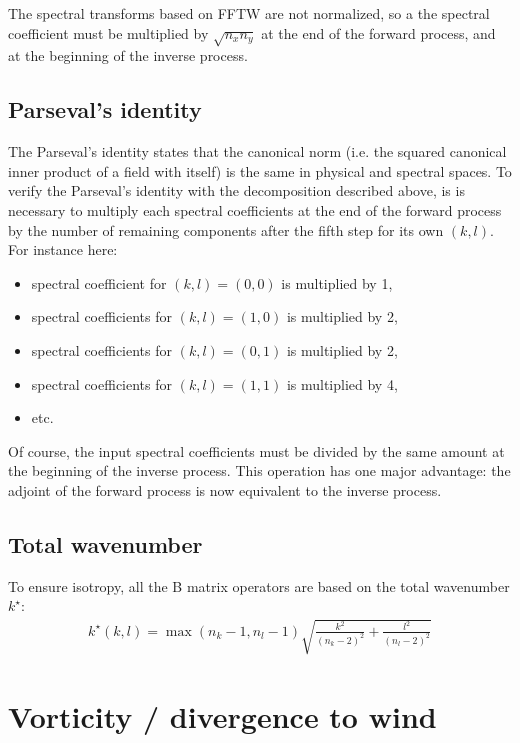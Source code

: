 \documentclass[12pt]{scrartcl}
\begin{document}
The spectral transforms based on FFTW are not normalized, so a the spectral coefficient must be multiplied by $\sqrt{n_x n_y}$ at the end of the forward process, and at the beginning of the inverse process.

\subsection{Parseval's identity}

The Parseval's identity states that the canonical norm (i.e. the squared canonical inner product of a field with itself) is the same in physical and spectral spaces. To verify the Parseval's identity with the decomposition described above, is is necessary to multiply each spectral coefficients at the end of the forward process by the number of remaining components after the fifth step for its own $(k,l)$. For instance here:
\begin{itemize}
\item spectral coefficient for $(k,l) = (0,0)$ is multiplied by 1,
\item spectral coefficients for $(k,l) = (1,0)$ is multiplied by 2,
\item spectral coefficients for $(k,l) = (0,1)$ is multiplied by 2,
\item spectral coefficients for $(k,l) = (1,1)$ is multiplied by 4,
\item etc.
\end{itemize}

Of course, the input spectral coefficients must be divided by the same amount at the beginning of the inverse process. This operation has one major advantage: the adjoint of the forward process is now equivalent to the inverse process.

\subsection{Total wavenumber}

To ensure isotropy, all the B matrix operators are based on the total wavenumber $k^\star$:
\begin{align}
k^\star(k,l) = \max(n_k-1, n_l-1) \sqrt{\frac{k^2}{(n_k-2)^2} + \frac{l^2}{(n_l-2)^2}}
\end{align}

\section{Vorticity / divergence to wind}
\end{document}
